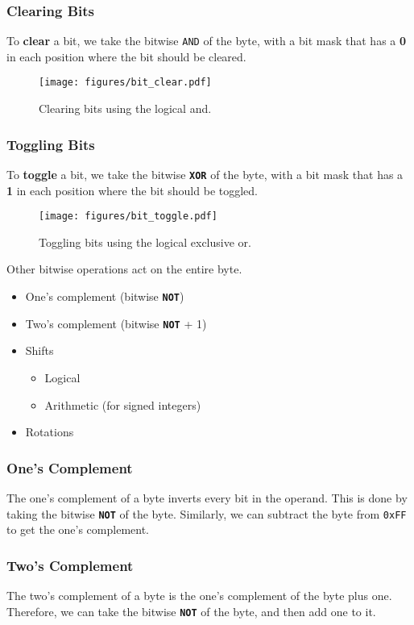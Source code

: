 \documentclass{article}
\newcommand{\keywordinline}[1]{\textcolor[rgb]{0.00,0.50,0.00}{\textbf{\texttt{#1}}}}
\begin{document}
\subsubsection{Clearing Bits}
To \textbf{clear} a bit, we take the bitwise \texttt{AND} of
the byte, with a bit mask that has a \textbf{0} in each position where
the bit should be cleared.
\begin{figure}[H]
    \centering
    \texttt{[image: figures/bit\_clear.pdf]}
    \caption{Clearing bits using the logical and.} %
\end{figure}
\subsubsection{Toggling Bits}
To \textbf{toggle} a bit, we take the bitwise \keywordinline{XOR} of
the byte, with a bit mask that has a \textbf{1} in each position where
the bit should be toggled.
\begin{figure}[H]
    \centering
    \texttt{[image: figures/bit\_toggle.pdf]}
    \caption{Toggling bits using the logical exclusive or.} %
\end{figure}
Other bitwise operations act on the entire byte.
\begin{itemize}
    \item One's complement (bitwise \keywordinline{NOT})
    \item Two's complement (bitwise \keywordinline{NOT} + 1)
    \item Shifts
          \begin{itemize}
              \item Logical
              \item Arithmetic (for signed integers)
          \end{itemize}
    \item Rotations
\end{itemize}
\subsubsection{One's Complement}
The one's complement of a byte inverts every bit in the operand. This
is done by taking the bitwise \keywordinline{NOT} of the byte.
Similarly, we can subtract the byte from \texttt{0xFF} to get
the one's complement.
\subsubsection{Two's Complement}
The two's complement of a byte is the one's complement of the byte plus
one. Therefore, we can take the bitwise \keywordinline{NOT} of the
byte, and then add one to it.
\end{document}
